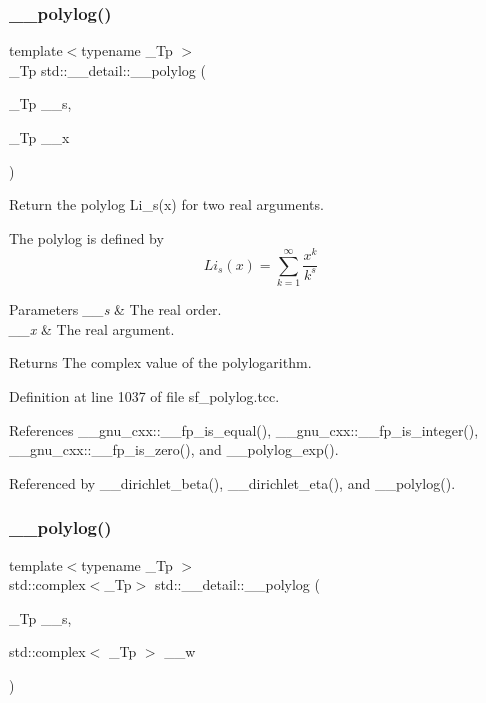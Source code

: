 \subsubsection{\texorpdfstring{\+\_\+\+\_\+polylog()}{\_\_polylog()}\hspace{0.1cm}{\footnotesize\ttfamily [1/2]}}
{\footnotesize\ttfamily template$<$typename \+\_\+\+Tp $>$ \\
\+\_\+\+Tp std\+::\+\_\+\+\_\+detail\+::\+\_\+\+\_\+polylog (\begin{DoxyParamCaption}\item[{\+\_\+\+Tp}]{\+\_\+\+\_\+s,  }\item[{\+\_\+\+Tp}]{\+\_\+\+\_\+x }\end{DoxyParamCaption})}

Return the polylog Li\+\_\+s(x) for two real arguments.

The polylog is defined by \[ Li_s(x) = \sum_{k=1}^{\infty} \frac{x^k}{k^s} \]


\begin{DoxyParams}{Parameters}
{\em \+\_\+\+\_\+s} & The real order. \\
\hline
{\em \+\_\+\+\_\+x} & The real argument. \\
\hline
\end{DoxyParams}
\begin{DoxyReturn}{Returns}
The complex value of the polylogarithm. 
\end{DoxyReturn}


Definition at line 1037 of file sf\+\_\+polylog.\+tcc.



References \+\_\+\+\_\+gnu\+\_\+cxx\+::\+\_\+\+\_\+fp\+\_\+is\+\_\+equal(), \+\_\+\+\_\+gnu\+\_\+cxx\+::\+\_\+\+\_\+fp\+\_\+is\+\_\+integer(), \+\_\+\+\_\+gnu\+\_\+cxx\+::\+\_\+\+\_\+fp\+\_\+is\+\_\+zero(), and \+\_\+\+\_\+polylog\+\_\+exp().



Referenced by \+\_\+\+\_\+dirichlet\+\_\+beta(), \+\_\+\+\_\+dirichlet\+\_\+eta(), and \+\_\+\+\_\+polylog().

\mbox{\label{namespacestd_1_1____detail_aa14e3ca6e4bee5ac1f1e5e1c2cee1d5a}} 
\subsubsection{\texorpdfstring{\+\_\+\+\_\+polylog()}{\_\_polylog()}\hspace{0.1cm}{\footnotesize\ttfamily [2/2]}}
{\footnotesize\ttfamily template$<$typename \+\_\+\+Tp $>$ \\
std\+::complex$<$\+\_\+\+Tp$>$ std\+::\+\_\+\+\_\+detail\+::\+\_\+\+\_\+polylog (\begin{DoxyParamCaption}\item[{\+\_\+\+Tp}]{\+\_\+\+\_\+s,  }\item[{std\+::complex$<$ \+\_\+\+Tp $>$}]{\+\_\+\+\_\+w }\end{DoxyParamCaption})}

